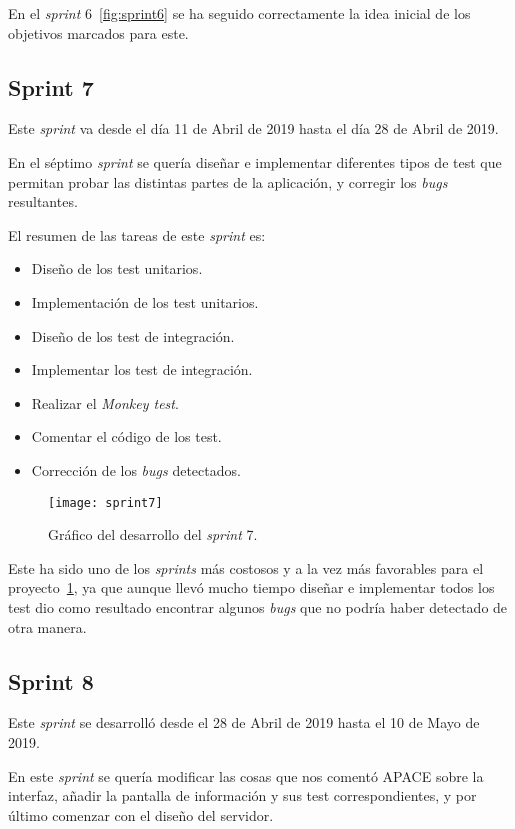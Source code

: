 En el \textit{sprint} 6~\ref{fig:sprint6} se ha seguido correctamente la idea inicial de los objetivos marcados para este.

\subsection{Sprint 7}
Este \textit{sprint} va desde el día 11 de Abril de 2019 hasta el día 28 de Abril de 2019.

En el séptimo \textit{sprint} se quería diseñar e implementar diferentes tipos de test que permitan probar las distintas partes de la aplicación, y corregir los \textit{bugs} resultantes.

El resumen de las tareas de este \textit{sprint} es:
\begin{itemize}
	\item Diseño de los test unitarios.
	\item Implementación de los test unitarios.
	\item Diseño de los test de integración.
	\item Implementar los test de integración.
	\item Realizar el \textit{Monkey test}.
	\item Comentar el código de los test.
	\item Corrección de los \textit{bugs} detectados.
\end{itemize}

\begin{figure}
	\centering
	\texttt{[image: sprint7]}
	\caption{Gráfico del desarrollo del \textit{sprint} 7.}
	\label{fig:sprint7}
\end{figure}

Este ha sido uno de los \textit{sprints} más costosos y a la vez más favorables para el proyecto~\ref{fig:sprint7}, ya que aunque llevó mucho tiempo diseñar e implementar todos los test dio como resultado encontrar algunos \textit{bugs} que no podría haber detectado de otra manera.

\subsection{Sprint 8}
Este \textit{sprint} se desarrolló desde el 28 de Abril de 2019 hasta el 10 de Mayo de 2019.

En este \textit{sprint} se quería modificar las cosas que nos comentó APACE sobre la interfaz, añadir la pantalla de información y sus test correspondientes, y por último comenzar con el diseño del servidor.


